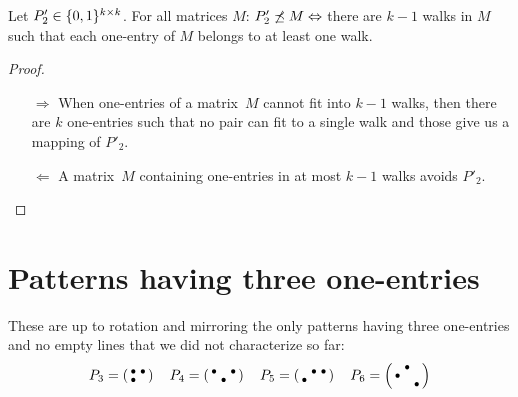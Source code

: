 \begin{prop}
\label{prop:walking}
Let $P'_2\in\{0,1\}^{k\times k}$. For all matrices $M$: $P'_2\not\preceq M\Leftrightarrow$ there are $k-1$ walks in $M$ such that each one-entry of $M$ belongs to at least one walk.
\end{prop}
\begin{proof}
\begin{itemize}
	\item[$\Rightarrow$] When one-entries of a matrix~$M$ cannot fit into $k-1$ walks, then there are $k$ one-entries such that no pair can fit to a single walk and those give us a mapping of $P'_2$.
	\item[$\Leftarrow$] A matrix~$M$ containing one-entries in at most $k-1$ walks avoids $P'_2$.
\end{itemize}
\end{proof}

\section{Patterns having three one-entries}
\label{sec:3ones}
These are up to rotation and mirroring the only patterns having three one-entries and no empty lines that we did not characterize so far:
$$P_3=\smm{\bullet&\bullet\\\bullet& }\ \ 
\ P_4=\smm{\bullet& &\bullet\\ &\bullet& }\ \ 
\ P_5=\smm{ &\bullet&\bullet\\\bullet& & }\ \ 
\ P_6=\smm{ &\bullet& \\\bullet& & \\ & &\bullet}$$

